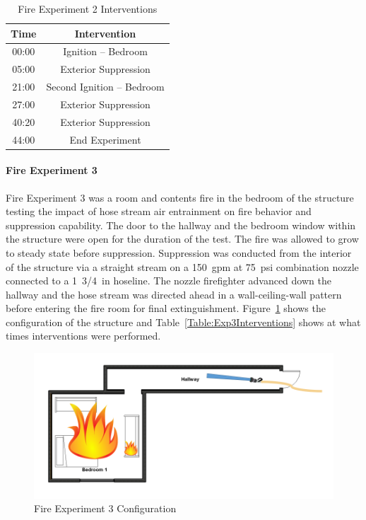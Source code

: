 \documentclass[12pt,oneside]{book}
\begin{document}
\begin{table}[H]
	\centering
	\caption{Fire Experiment 2 Interventions}
	\begin{tabular}{|c|c|} 
		\hline
		Time & Intervention \\ \hline \hline
		00:00 & Ignition -- Bedroom \\ \hline
		05:00 & Exterior Suppression \\ \hline
		21:00 & Second Ignition -- Bedroom \\ \hline
		27:00 & Exterior Suppression \\ \hline
		40:20 & Exterior Suppression \\ \hline
		44:00 & End Experiment\\ \hline
	\end{tabular}
	\label{Table:Exp2Interventions}
\end{table}

\clearpage

\paragraph{Fire Experiment 3} \mbox{}

Fire Experiment 3 was a room and contents fire in the bedroom of the structure testing the impact of hose stream air entrainment on fire behavior and suppression capability. The door to the hallway and the bedroom window within the structure were open for the duration of the test. The fire was allowed to grow to steady state before suppression. Suppression was conducted from the interior of the structure via a straight stream on a 150~gpm at 75~psi combination nozzle connected to a 1~3/4~in hoseline. The nozzle firefighter advanced down the hallway and the hose stream was directed ahead in a wall-ceiling-wall pattern before entering the fire room for final extinguishment. Figure~\ref{fig:Exp3Config} shows the configuration of the structure and Table~\ref{Table:Exp3Interventions} shows at what times interventions were performed.  


\begin{figure}[H]
	\centering
	\includegraphics[width=5in]{Howard_Exp_3.png}
	\caption{Fire Experiment 3 Configuration}
	\label{fig:Exp3Config}
\end{figure}
\end{document}

